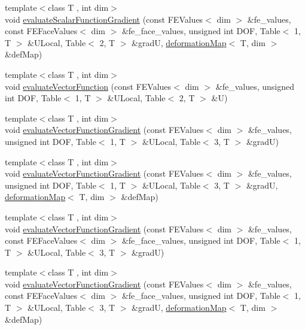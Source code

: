 \begin{DoxyCompactItemize}
\item 
{\footnotesize template$<$class T , int dim$>$ }\\void \mbox{\hyperlink{group___evaluation_functions_gabedd4ae2841d2332ed0df0513b189e34}{evaluate\+Scalar\+Function\+Gradient}} (const F\+E\+Values$<$ dim $>$ \&fe\+\_\+values, const F\+E\+Face\+Values$<$ dim $>$ \&fe\+\_\+face\+\_\+values, unsigned int D\+OF, Table$<$ 1, T $>$ \&U\+Local, Table$<$ 2, T $>$ \&gradU, \mbox{\hyperlink{structdeformation_map}{deformation\+Map}}$<$ T, dim $>$ \&def\+Map)
\item 
{\footnotesize template$<$class T , int dim$>$ }\\void \mbox{\hyperlink{group___evaluation_functions_gab9e164be1be244df81c932426a4bd513}{evaluate\+Vector\+Function}} (const F\+E\+Values$<$ dim $>$ \&fe\+\_\+values, unsigned int D\+OF, Table$<$ 1, T $>$ \&U\+Local, Table$<$ 2, T $>$ \&U)
\item 
{\footnotesize template$<$class T , int dim$>$ }\\void \mbox{\hyperlink{group___evaluation_functions_ga84eb2ee714466f113c96fcf6a9fd23e8}{evaluate\+Vector\+Function\+Gradient}} (const F\+E\+Values$<$ dim $>$ \&fe\+\_\+values, unsigned int D\+OF, Table$<$ 1, T $>$ \&U\+Local, Table$<$ 3, T $>$ \&gradU)
\item 
{\footnotesize template$<$class T , int dim$>$ }\\void \mbox{\hyperlink{group___evaluation_functions_ga5adf8aa2d91dbdf393aa91dcc65e42e8}{evaluate\+Vector\+Function\+Gradient}} (const F\+E\+Values$<$ dim $>$ \&fe\+\_\+values, unsigned int D\+OF, Table$<$ 1, T $>$ \&U\+Local, Table$<$ 3, T $>$ \&gradU, \mbox{\hyperlink{structdeformation_map}{deformation\+Map}}$<$ T, dim $>$ \&def\+Map)
\item 
{\footnotesize template$<$class T , int dim$>$ }\\void \mbox{\hyperlink{group___evaluation_functions_gab2771d18ff704decbbc12ca2b848bbfe}{evaluate\+Vector\+Function\+Gradient}} (const F\+E\+Values$<$ dim $>$ \&fe\+\_\+values, const F\+E\+Face\+Values$<$ dim $>$ \&fe\+\_\+face\+\_\+values, unsigned int D\+OF, Table$<$ 1, T $>$ \&U\+Local, Table$<$ 3, T $>$ \&gradU)
\item 
{\footnotesize template$<$class T , int dim$>$ }\\void \mbox{\hyperlink{group___evaluation_functions_ga9608539d601a91aff1ba01ccc720fbe0}{evaluate\+Vector\+Function\+Gradient}} (const F\+E\+Values$<$ dim $>$ \&fe\+\_\+values, const F\+E\+Face\+Values$<$ dim $>$ \&fe\+\_\+face\+\_\+values, unsigned int D\+OF, Table$<$ 1, T $>$ \&U\+Local, Table$<$ 3, T $>$ \&gradU, \mbox{\hyperlink{structdeformation_map}{deformation\+Map}}$<$ T, dim $>$ \&def\+Map)

\end{DoxyCompactItemize}
